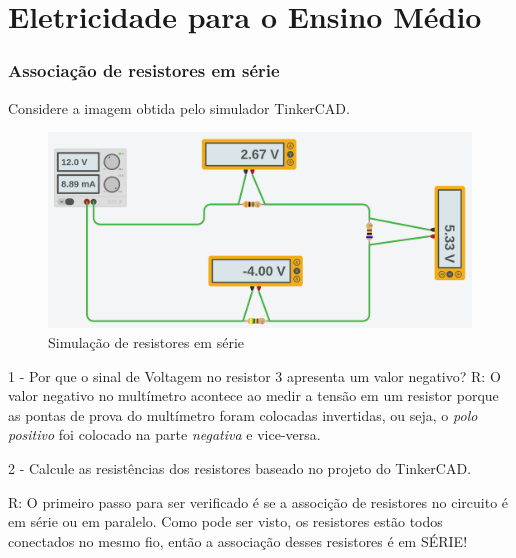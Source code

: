 
\chapter{Eletricidade para o Ensino Médio}
\subsection{Associação de resistores em série}

Considere a imagem obtida pelo simulador TinkerCAD.

\begin{figure}[H]
	\caption{Simulação de resistores em série}
	\begin{center}
		\includegraphics[width=\linewidth]{Pictures/FISICA_EM/ELETRICIDADE/resistores_serie.png}
	\end{center}
	\label{fig:funcao_linear}
	\hspace{1.5cm}
\end{figure}


1 - Por que o sinal de Voltagem no resistor 3 apresenta um valor negativo?
R: O valor negativo no multímetro acontece ao medir a tensão em um resistor porque as pontas de prova do multímetro foram colocadas invertidas, ou seja, o \textit{polo positivo} foi colocado na parte \textit{negativa} e vice-versa.

2 - Calcule as resistências dos resistores baseado no projeto do TinkerCAD.

R: O primeiro passo para ser verificado é se a associção de resistores no circuito é em série ou em paralelo.
Como pode ser visto, os resistores estão todos conectados no mesmo fio, então a associação desses resistores é em SÉRIE!

